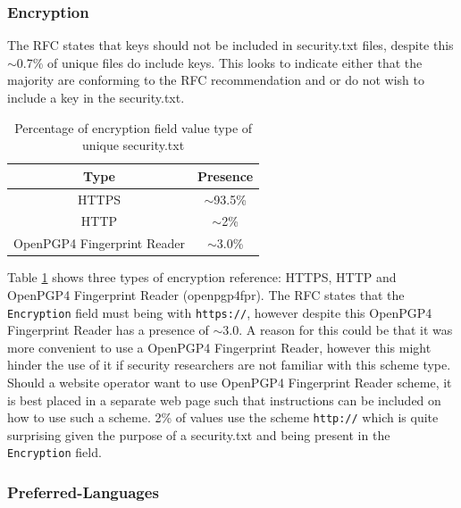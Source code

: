 \documentclass{mscreport}
\begin{document}
\subsubsection{Encryption}

\noindent
The RFC states that keys should not be included in security.txt files, despite this $\sim$0.7\% of unique files do include keys. This looks to indicate either that the majority are conforming to the RFC recommendation and or do not wish to include a key in the security.txt.

\begin{table}[H]
  \begin{center}
    \begin{tabular}{|c|c|}  %
      \hline
      \textbf{Type} & \textbf{Presence}\\
      \hline
      HTTPS & $\sim$93.5\%\\
      \hline
      HTTP & $\sim$2\%\\
      \hline
      OpenPGP4 Fingerprint Reader & $\sim$3.0\%\\
      \hline
    \end{tabular}
    \caption{Percentage of encryption field value type of unique security.txt}
    \label{table:security_txt_encryption_type} %
  \end{center}
\end{table}


\noindent
Table \ref{table:security_txt_encryption_type} shows three types of encryption reference: HTTPS, HTTP and OpenPGP4 Fingerprint Reader (openpgp4fpr). The RFC states that the \texttt{Encryption} field must being with \texttt{https://}, however despite this OpenPGP4 Fingerprint Reader has a presence of $\sim$3.0. A reason for this could be that it was more convenient to use a OpenPGP4 Fingerprint Reader, however this might hinder the use of it if security researchers are not familiar with this scheme type. Should a website operator want to use OpenPGP4 Fingerprint Reader scheme, it is best placed in a separate web page such that instructions can be included on how to use such a scheme. 2\% of values use the scheme \texttt{http://} which is quite surprising given the purpose of a security.txt and being present in the \texttt{Encryption} field.


\subsubsection{Preferred-Languages}
\end{document}
